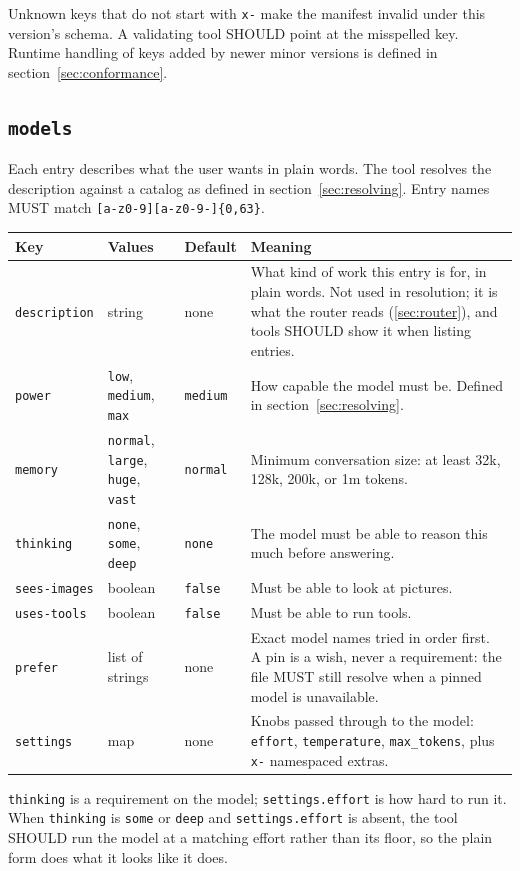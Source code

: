 \documentclass[11pt]{article}
\newcommand{\key}[1]{\texttt{#1}}
\begin{document}
\medskip
Unknown keys that do not start with \key{x-} make the manifest invalid under
this version's schema. A validating tool SHOULD point at the misspelled
key. Runtime handling of keys added by newer minor versions is defined in
section~\ref{sec:conformance}.

\subsection{\texorpdfstring{\key{models}}{models}}

Each entry describes what the user wants in plain words. The tool
resolves the description against a catalog as defined in
section~\ref{sec:resolving}. Entry names MUST match
\key{[a-z0-9][a-z0-9-]\{0,63\}}.

\begin{tabularx}{\textwidth}{@{}lllX@{}}
\toprule
Key & Values & Default & Meaning \\
\midrule
\key{description} & string & none & What kind of work this entry is for, in plain words. Not used in resolution; it is what the router reads (\ref{sec:router}), and tools SHOULD show it when listing entries. \\
\key{power} & \key{low}, \key{medium}, \key{max} & \key{medium} & How capable the model must be. Defined in section~\ref{sec:resolving}. \\
\key{memory} & \key{normal}, \key{large}, \key{huge}, \key{vast} & \key{normal} & Minimum conversation size: at least 32k, 128k, 200k, or 1m tokens. \\
\key{thinking} & \key{none}, \key{some}, \key{deep} & \key{none} & The model must be able to reason this much before answering. \\
\key{sees-images} & boolean & \key{false} & Must be able to look at pictures. \\
\key{uses-tools} & boolean & \key{false} & Must be able to run tools. \\
\key{prefer} & list of strings & none & Exact model names tried in order first. A pin is a wish, never a requirement: the file MUST still resolve when a pinned model is unavailable. \\
\key{settings} & map & none & Knobs passed through to the model: \key{effort}, \key{temperature}, \key{max\_tokens}, plus \key{x-} namespaced extras. \\
\bottomrule
\end{tabularx}

\medskip
\key{thinking} is a requirement on the model; \key{settings.effort} is how hard
to run it. When \key{thinking} is \key{some} or \key{deep} and
\key{settings.effort} is absent, the tool SHOULD run the model at a matching
effort rather than its floor, so the plain form does what it looks like it
does.
\end{document}
